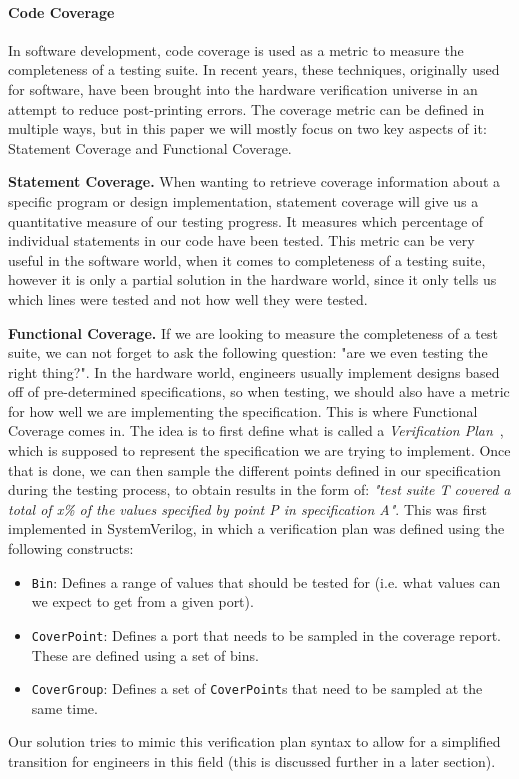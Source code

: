 \documentclass[conference]{IEEEtran}
\begin{document}
\paragraph{Code Coverage} In software development, code coverage is used as a metric to measure the completeness of a testing suite. In recent years, these techniques, originally used for software, have been brought into the hardware verification universe in an attempt to reduce post-printing errors. The coverage metric can be defined in multiple ways, but in this paper we will mostly focus on two key aspects of it: Statement Coverage and Functional Coverage.

\textbf{Statement Coverage.} When wanting to retrieve coverage information about a specific program or design implementation, statement coverage will give us a quantitative measure of our testing progress. It measures which percentage of individual statements in our code have been tested. This metric can be very useful in the software world, when it comes to completeness of a testing suite, however it is only a partial solution in the hardware world, since it only tells us which lines were tested and not how well they were tested.  

\textbf{Functional Coverage.} If we are looking to measure the completeness of a test suite, we can not forget to ask the following question: "are we even testing the right thing?". In the hardware world, engineers usually implement designs based off of pre-determined specifications, so when testing, we should also have a metric for how well we are implementing the specification. This is where Functional Coverage comes in. The idea is to first define what is called a \textit{Verification Plan}~\cite{spear2008systemverilog}, which is supposed to represent the specification we are trying to implement. Once that is done, we can then sample the different points defined in our specification during the testing process, to obtain results in the form of: \textit{"test suite T covered a total of x\% of the values specified by point P in specification A"}. This was first implemented in SystemVerilog, in which a verification plan was defined using the following constructs:  
\begin{itemize}
\item \texttt{Bin}: Defines a range of values that should be tested for (i.e. what values can we expect to get from a given port).
\item \texttt{CoverPoint}: Defines a port that needs to be sampled in the coverage report. These are defined using a set of bins.
\item \texttt{CoverGroup}: Defines a set of \texttt{CoverPoint}s that need to be sampled at the same time.
\end{itemize}
Our solution tries to mimic this verification plan syntax to allow for a simplified transition for engineers in this field (this is discussed further in a later section).
\end{document}
